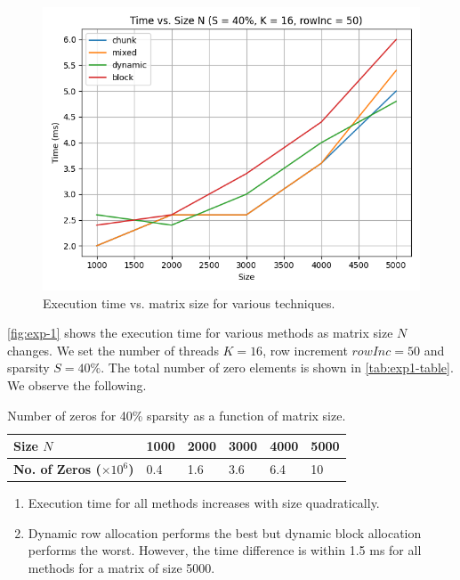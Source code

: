 \documentclass[conference,compsoc]{IEEEtran}
\begin{document}
\begin{figure}[!ht]
    \includegraphics[width=\columnwidth]{images/exp1.png}
    \caption{Execution time vs. matrix size for various techniques.}
    \label{fig:exp-1}
\end{figure}

\autoref{fig:exp-1} shows the execution time for various methods as matrix size
\(N\) changes. We set the number of threads \(K = 16\), row increment \(rowInc =
50\) and sparsity \(S = 40\%\). The total number of zero elements is shown in
\autoref{tab:exp1-table}. We observe the following.

\begin{table}[!ht]
    \begin{tabularx}{\columnwidth}{|Y|Y|Y|Y|Y|Y|}
        \hline
        \textbf{Size \(N\)} & 1000 & 2000 & 3000 & 4000 & 5000 \\
        \hline
        \textbf{No. of Zeros (\(\times 10^6\))} & 0.4 & 1.6 & 3.6 & 6.4 & 10 \\
        \hline
    \end{tabularx}
    \caption{Number of zeros for 40\% sparsity as a function of matrix size.}
    \label{tab:exp1-table}
\end{table}

\begin{enumerate}
    \item Execution time for all methods increases with size quadratically.
    \item Dynamic row allocation performs the best but dynamic block allocation
    performs the worst. However, the time difference is within 1.5 ms for all
    methods for a matrix of size 5000.
\end{enumerate}
\end{document}
